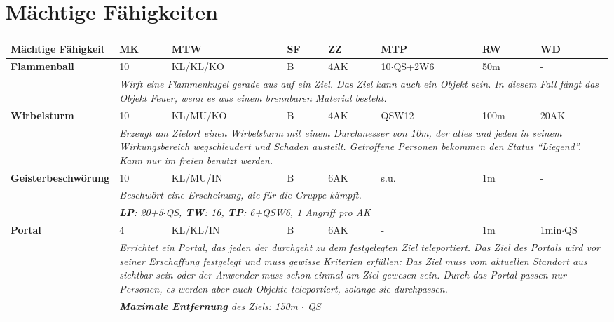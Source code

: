 \section{Mächtige Fähigkeiten}

\begin{longtable}{|p{4cm}|p{0.8cm}|p{2.2cm}|p{0.6cm}|p{1cm}|p{2.2cm}|p{0.9cm}|p{2.2cm}|}
\hline
\textbf{Mächtige Fähigkeit} & \textbf{MK} & \textbf{MTW} & \textbf{SF} & \textbf{ZZ} & \textbf{MTP} & \textbf{RW} & \textbf{WD} \\

\hline
\textbf{Flammenball} & 10 & KL/KL/KO & B & 4AK & 10$\cdot$QS+2W6 & 50m & - \\ \hline
\multicolumn{1}{r}{} & \multicolumn{7}{|p{13cm}|}{\textit{Wirft eine Flammenkugel gerade aus auf ein Ziel. Das Ziel kann auch ein Objekt sein. In diesem Fall fängt das Objekt Feuer, wenn es aus einem brennbaren Material besteht.}} \\

\hline
\textbf{Wirbelsturm} & 10 & KL/MU/KO & B & 4AK & QSW12 & 100m & 20AK \\ \hline
\multicolumn{1}{r}{} & \multicolumn{7}{|p{13cm}|}{\textit{Erzeugt am Zielort einen Wirbelsturm mit einem Durchmesser von 10m, der alles und jeden in seinem Wirkungsbereich wegschleudert und Schaden austeilt. Getroffene Personen bekommen den Status "`Liegend"'. Kann nur im freien benutzt werden.}} \\

\hline
\textbf{Geisterbeschwörung} & 10 & KL/MU/IN & B & 6AK & s.u. & 1m & - \\ \hline
\multicolumn{1}{r}{} & \multicolumn{7}{|p{13cm}|}{\textit{Beschwört eine Erscheinung, die für die Gruppe kämpft.}} \\
\multicolumn{1}{r}{} & \multicolumn{7}{|p{13cm}|}{\textit{\textbf{LP}: 20+5$\cdot$QS, \textbf{TW}: 16, \textbf{TP}: 6+QSW6, 1 Angriff pro AK}} \\

\hline
\textbf{Portal} & 4 & KL/KL/IN & B & 6AK & - & 1m & 1min$\cdot$QS \\ \hline
\multicolumn{1}{r}{} & \multicolumn{7}{|p{13cm}|}{\textit{Errichtet ein Portal, das jeden der durchgeht zu dem festgelegten Ziel teleportiert. Das Ziel des Portals wird vor seiner Erschaffung festgelegt und muss gewisse Kriterien erfüllen: Das Ziel muss vom aktuellen Standort aus sichtbar sein oder der Anwender muss schon einmal am Ziel gewesen sein. Durch das Portal passen nur Personen, es werden aber auch Objekte teleportiert, solange sie durchpassen.}} \\
\multicolumn{1}{r}{} & \multicolumn{7}{|p{13cm}|}{\textit{\textbf{Maximale Entfernung} des Ziels: 150m $\cdot$ QS}} \\


\end{longtable}
